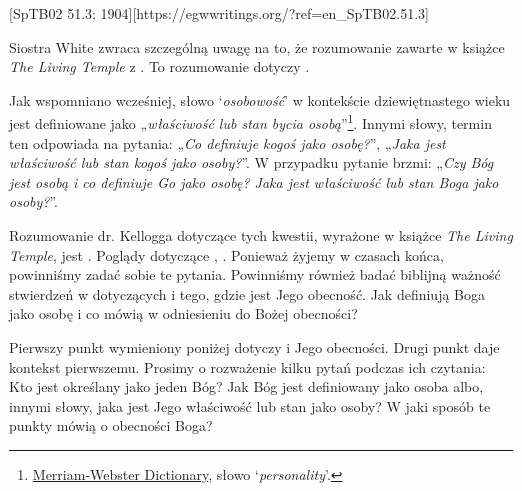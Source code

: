 [SpTB02 51.3; 1904][https://egwwritings.org/?ref=en\_SpTB02.51.3]

Siostra White zwraca szczególną uwagę na to, że rozumowanie zawarte w książce \textit{The Living Temple}  z . To rozumowanie dotyczy .

Jak wspomniano wcześniej, słowo ‘\textit{osobowość}’ w kontekście dziewiętnastego wieku jest definiowane jako „\textit{właściwość lub stan bycia osobą}”\footnote{\href{https://www.merriam-webster.com/dictionary/personality}{Merriam-Webster Dictionary}, słowo ‘\textit{personality}’.}. Innymi słowy, termin ten odpowiada na pytania: „\textit{Co definiuje kogoś jako osobę?}”, „\textit{Jaka jest właściwość lub stan kogoś jako osoby?}”. W przypadku  pytanie brzmi: „\textit{Czy Bóg jest osobą i co definiuje Go jako osobę? Jaka jest właściwość lub stan Boga jako osoby?}”.

Rozumowanie dr. Kellogga dotyczące tych kwestii, wyrażone w książce \textit{The Living Temple}, jest . Poglądy dotyczące , . Ponieważ żyjemy w czasach końca, powinniśmy zadać sobie te pytania. Powinniśmy również badać biblijną ważność stwierdzeń w  dotyczących  i tego, gdzie jest Jego obecność. Jak  definiują Boga jako osobę i co mówią w odniesieniu do Bożej obecności?

Pierwszy punkt wymieniony poniżej dotyczy  i Jego obecności. Drugi punkt daje kontekst pierwszemu. Prosimy o rozważenie kilku pytań podczas ich czytania: Kto jest określany jako jeden Bóg? Jak Bóg jest definiowany jako osoba albo, innymi słowy, jaka jest Jego właściwość lub stan jako osoby? W jaki sposób te punkty mówią o obecności Boga?

